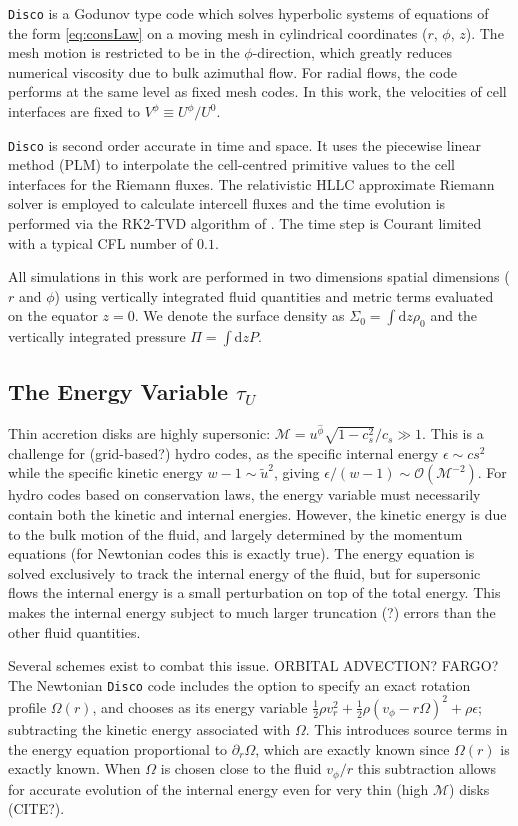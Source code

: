 \documentclass{emulateapj}
\newcommand{\eps}{\epsilon}
\newcommand{\Sig}{\Sigma}
\newcommand{\Om}{\Omega}
\newcommand{\Mach}{\mathcal{M}}
\newcommand{\pd}{\partial}
\newcommand{\dd}{\mbox{d}}
\newcommand{\Disco}{{\texttt{Disco}}}
\newcommand{\OO}{\mathcal{O}}
\begin{document}
\Disco{} is a Godunov type code which solves hyperbolic systems of equations of the form \eqref{eq:consLaw} on a moving mesh in cylindrical coordinates ($r$, $\phi$, $z$).  The mesh motion is restricted to be in the $\phi$-direction, which greatly reduces numerical viscosity due to bulk azimuthal flow.  For radial flows, the code performs at the same level as fixed mesh codes.  In this work, the velocities of cell interfaces are fixed to $V^\phi \equiv U^\phi/U^0$.   

\Disco{} is second order accurate in time and space.  It uses the piecewise linear method (PLM) to interpolate the cell-centred primitive values to the cell interfaces for the Riemann fluxes.  The relativistic HLLC approximate Riemann solver \citep{Mignone05} is employed to calculate intercell fluxes and the time evolution is performed via the RK2-TVD algorithm of \cite{Gottlieb98}.  The time step is Courant limited with a typical CFL number of $0.1$.

All simulations in this work are performed in two dimensions spatial dimensions ($r$ and $\phi$) using vertically integrated fluid quantities and metric terms evaluated on the equator $z=0$.  We denote the surface density as $\Sig_0 = \int \dd z \rho_0$ and the vertically integrated pressure $\Pi = \int \dd z P$.  

\subsection{The Energy Variable $\tau_U$}
\label{subsec:energy}

Thin accretion disks are highly supersonic: $\Mach = u^{\hat{\phi}} \sqrt{1-c_s^2}/c_s \gg 1$.  This is a challenge for (grid-based?) hydro codes, as the specific internal energy $\eps \sim cs^2$ while the specific kinetic energy $w-1 \sim \tilde{u}^2$, giving $\eps / (w-1) \sim \OO(\Mach^{-2})$.  For hydro codes based on conservation laws, the energy variable must necessarily contain both the kinetic and internal energies.  However, the kinetic energy is due to the bulk motion of the fluid, and largely determined by the momentum equations (for Newtonian codes this is exactly true).  The energy equation is solved exclusively to track the internal energy of the fluid, but for supersonic flows the internal energy is a small perturbation on top of the total energy.  This makes the internal energy subject to much larger truncation (?) errors than the other fluid quantities.

Several schemes exist to combat this issue.  ORBITAL ADVECTION? FARGO? The Newtonian \Disco{} code includes the option to specify an exact rotation profile $\Om(r)$, and chooses as its energy variable $\frac{1}{2}\rho v_r^2 + \frac{1}{2}\rho(v_\phi-r\Om)^2 + \rho \eps$; subtracting the kinetic energy associated with $\Om$. This introduces source terms in the energy equation proportional to $\pd_r \Om$, which are exactly known since $\Om(r)$ is exactly known.  When $\Om$ is chosen close to the fluid $v_\phi / r$ this subtraction allows for accurate evolution of the internal energy even for very thin (high $\Mach$) disks (CITE?).
\end{document}
